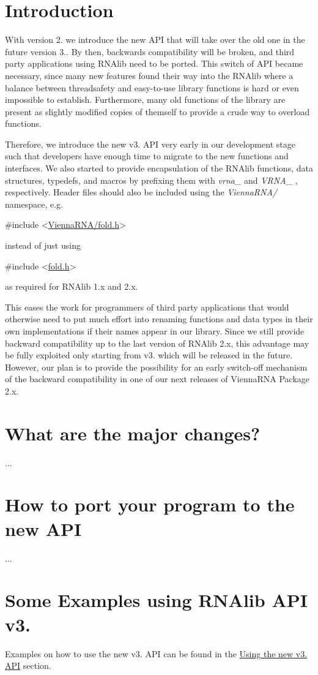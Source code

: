 \hypertarget{newAPI_newAPI_intro}{}\section{Introduction}\label{newAPI_newAPI_intro}
With version 2. we introduce the new A\+PI that will take over the old one in the future version 3.. By then, backwards compatibility will be broken, and third party applications using R\+N\+Alib need to be ported. This switch of A\+PI became necessary, since many new features found their way into the R\+N\+Alib where a balance between threadsafety and easy-\/to-\/use library functions is hard or even impossible to establish. Furthermore, many old functions of the library are present as slightly modified copies of themself to provide a crude way to overload functions.

Therefore, we introduce the new v3. A\+PI very early in our development stage such that developers have enough time to migrate to the new functions and interfaces. We also started to provide encapsulation of the R\+N\+Alib functions, data structures, typedefs, and macros by prefixing them with {\itshape vrna\+\_\+} and {\itshape V\+R\+N\+A\+\_\+} , respectively. Header files should also be included using the {\itshape Vienna\+R\+N\+A/} namespace, e.\+g. 
\begin{DoxyCode}
\textcolor{preprocessor}{#include <\hyperlink{fold_8h}{ViennaRNA/fold.h}>}
\end{DoxyCode}
 instead of just using 
\begin{DoxyCode}
\textcolor{preprocessor}{#include <\hyperlink{fold_8h}{fold.h}>}
\end{DoxyCode}
 as required for R\+N\+Alib 1.\+x and 2.\+x.

This eases the work for programmers of third party applications that would otherwise need to put much effort into renaming functions and data types in their own implementations if their names appear in our library. Since we still provide backward compatibility up to the last version of R\+N\+Alib 2.\+x, this advantage may be fully exploited only starting from v3. which will be released in the future. However, our plan is to provide the possibility for an early switch-\/off mechanism of the backward compatibility in one of our next releases of Vienna\+R\+NA Package 2.\+x.\hypertarget{newAPI_newAPI_changes}{}\section{What are the major changes?}\label{newAPI_newAPI_changes}
...\hypertarget{newAPI_newAPI_porting}{}\section{How to port your program to the new A\+PI}\label{newAPI_newAPI_porting}
...\hypertarget{newAPI_newAPI_examples}{}\section{Some Examples using R\+N\+Alib A\+P\+I v3.}\label{newAPI_newAPI_examples}
Examples on how to use the new v3. A\+PI can be found in the \hyperlink{mp_example_examples_c_new_API}{Using the \textquotesingle{}new\textquotesingle{} v3. A\+PI} section. 